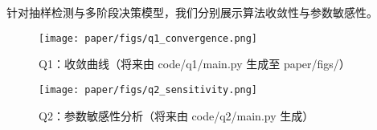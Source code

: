 针对抽样检测与多阶段决策模型，我们分别展示算法收敛性与参数敏感性。
\begin{figure}[htbp]\centering
  \texttt{[image: paper/figs/q1\_convergence.png]}
  \caption{Q1：收敛曲线（将来由 code/q1/main.py 生成至 paper/figs/）}
\end{figure}
\begin{figure}[htbp]\centering
  \texttt{[image: paper/figs/q2\_sensitivity.png]}
  \caption{Q2：参数敏感性分析（将来由 code/q2/main.py 生成）}
\end{figure}
